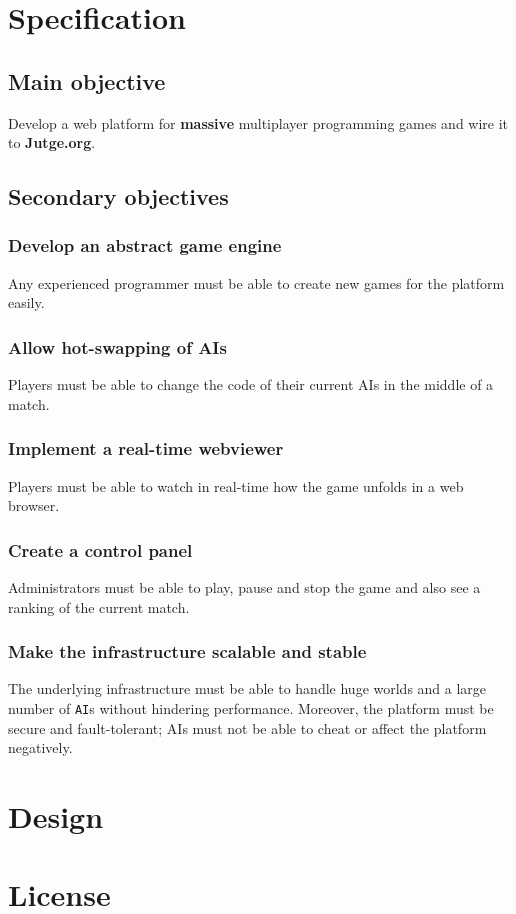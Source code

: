 \documentclass[a4paper,11pt,titlepage,abstract,numbers=noenddot,automark,mnsy,intlimits,rgb,dvipsnames]{report}
\begin{document}
\chapter{Specification}
\section{Main objective}
Develop a web platform for \textbf{massive} multiplayer programming games and wire it to \textbf{Jutge.org}.
\section{Secondary objectives}
\subsection{Develop an abstract game engine}
Any experienced programmer must be able to create new games for the platform easily.
\subsection{Allow hot-swapping of AIs}
Players must be able to change the code of their current AIs in the middle of a match.
\subsection{Implement a real-time webviewer}
Players must be able to watch in real-time how the game unfolds in a web browser.
\subsection{Create a control panel}
Administrators must be able to play, pause and stop the game and also see a ranking of the current match.
\subsection{Make the infrastructure scalable and stable}
The underlying infrastructure must be able to handle huge worlds and a large number of \texttt{AI}s without
hindering performance. Moreover, the platform must be secure and fault-tolerant; AIs must not be able to cheat
or affect the platform negatively.
\clearpage
\chapter{Design}
\clearpage
\chapter{License}
\end{document}
